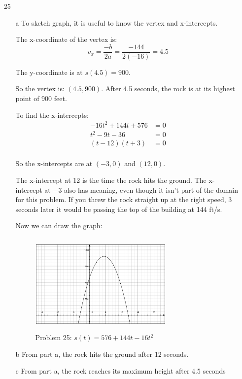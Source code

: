 \documentclass[fleqn,addpoints]{exam}
\begin{document}
\begin{itemize}

\item[25]
\begin{itemize}
\item[a]
To sketch graph, it is useful to know the vertex and x-intercepts.

The x-coordinate of the vertex is:
\[
  v_x = \frac{-b}{2a} = \frac{-144}{2(-16)} = 4.5
\]

The y-coordinate is at $s(4.5) = 900$.

So the vertex is: $(4.5, 900)$.  After 4.5 seconds, the rock is at its highest point of 900 feet.

To find the x-intercepts:
\begin{align*}
  -16t^2 + 144t + 576 &= 0 \\
  t^2 - 9t - 36 &= 0 \\
  (t-12)(t+3) &= 0 \\
\end{align*}

So the x-intercepts are at $(-3, 0)$ and $(12, 0)$.

The x-intercept at 12 is the time the rock hits the ground.  The x-intercept at $-3$ also has meaning, even though it
isn't part of the domain for this problem.  If you threw the rock straight up at the right speed, 3 seconds later it
would be passing the top of the building at 144 ft/s.

Now we can draw the graph:
\begin{figure}[H]
  \centering
  \includegraphics[width=7cm,height=5cm]{p65-25.eps}
  \caption*{Problem 25: $s(t) = 576 + 144t - 16t^2$}
\end{figure}

\item[b]
From part a, the rock hits the ground after 12 seconds.

\item[c]
From part a, the rock reaches its maximum height after 4.5 seconds


\end{itemize}
\end{itemize}
\end{document}
